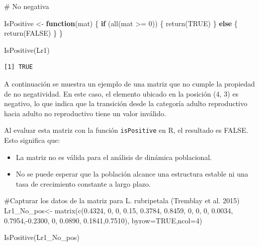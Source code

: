 \documentclass[
  12pt,
  letterpaper,
]{book}
\newenvironment{Shaded}{\begin{snugshade}}{\end{snugshade}}
\newcommand{\AttributeTok}[1]{\textcolor[rgb]{0.40,0.45,0.13}{#1}}
\newcommand{\CommentTok}[1]{\textcolor[rgb]{0.37,0.37,0.37}{#1}}
\newcommand{\ConstantTok}[1]{\textcolor[rgb]{0.56,0.35,0.01}{#1}}
\newcommand{\ControlFlowTok}[1]{\textcolor[rgb]{0.00,0.23,0.31}{\textbf{#1}}}
\newcommand{\DecValTok}[1]{\textcolor[rgb]{0.68,0.00,0.00}{#1}}
\newcommand{\FloatTok}[1]{\textcolor[rgb]{0.68,0.00,0.00}{#1}}
\newcommand{\FunctionTok}[1]{\textcolor[rgb]{0.28,0.35,0.67}{#1}}
\newcommand{\NormalTok}[1]{\textcolor[rgb]{0.00,0.23,0.31}{#1}}
\newcommand{\OtherTok}[1]{\textcolor[rgb]{0.00,0.23,0.31}{#1}}
\newcommand{\SpecialCharTok}[1]{\textcolor[rgb]{0.37,0.37,0.37}{#1}}
\providecommand{\tightlist}{%
  \setlength{\itemsep}{0pt}\setlength{\parskip}{0pt}}\usepackage{longtable,booktabs,array}
\begin{document}
\begin{Shaded}
\begin{Highlighting}[]
\CommentTok{\# No negativa }

\NormalTok{IsPositive }\OtherTok{\textless{}{-}} \ControlFlowTok{function}\NormalTok{(mat) \{}
  \ControlFlowTok{if}\NormalTok{ (}\FunctionTok{all}\NormalTok{(mat }\SpecialCharTok{\textgreater{}=} \DecValTok{0}\NormalTok{)) \{}
    \FunctionTok{return}\NormalTok{(}\ConstantTok{TRUE}\NormalTok{)}
\NormalTok{  \} }\ControlFlowTok{else}\NormalTok{ \{}
    \FunctionTok{return}\NormalTok{(}\ConstantTok{FALSE}\NormalTok{)}
\NormalTok{  \}}
\NormalTok{\}}

\FunctionTok{IsPositive}\NormalTok{(Lr1)}
\end{Highlighting}
\end{Shaded}

\begin{verbatim}
[1] TRUE
\end{verbatim}

A continuación se muestra un ejemplo de una matriz que no cumple la
propiedad de no negatividad. En este caso, el elemento ubicado en la
posición (4, 3) es negativo, lo que indica que la transición desde la
categoría adulto reproductivo hacia adulto no reproductivo tiene un
valor inválido.

Al evaluar esta matriz con la función \texttt{isPositive} en R, el
resultado es FALSE. Esto significa que:

\begin{itemize}
\tightlist
\item
  La matriz no es válida para el análisis de dinámica poblacional.
\item
  No se puede esperar que la población alcance una estructura estable ni
  una tasa de crecimiento constante a largo plazo.
\end{itemize}

\begin{Shaded}
\begin{Highlighting}[]
\CommentTok{\#Capturar los datos de la matriz para L. rubripetala (Tremblay et al. 2015)}
\NormalTok{Lr1\_No\_pos}\OtherTok{\textless{}{-}} \FunctionTok{matrix}\NormalTok{(}\FunctionTok{c}\NormalTok{(}\FloatTok{0.4324}\NormalTok{, }\DecValTok{0}\NormalTok{,      }\DecValTok{0}\NormalTok{,     }\FloatTok{0.15}\NormalTok{,}
               \FloatTok{0.3784}\NormalTok{, }\FloatTok{0.8459}\NormalTok{, }\DecValTok{0}\NormalTok{,     }\DecValTok{0}\NormalTok{,}
               \DecValTok{0}\NormalTok{,      }\FloatTok{0.0034}\NormalTok{, }\FloatTok{0.7954}\NormalTok{,}\SpecialCharTok{{-}}\FloatTok{0.2300}\NormalTok{,}
               \DecValTok{0}\NormalTok{,      }\FloatTok{0.0890}\NormalTok{, }\FloatTok{0.1841}\NormalTok{,}\FloatTok{0.7510}\NormalTok{), }\AttributeTok{byrow=}\ConstantTok{TRUE}\NormalTok{,}\AttributeTok{ncol=}\DecValTok{4}\NormalTok{)}



\FunctionTok{IsPositive}\NormalTok{(Lr1\_No\_pos)}
\end{Highlighting}
\end{Shaded}
\end{document}
